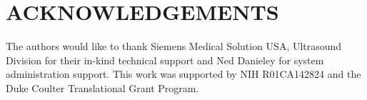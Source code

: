 \section*{ACKNOWLEDGEMENTS}
The authors would like to thank Siemens Medical Solution USA, Ultrasound
Division for their in-kind technical support and Ned Danieley for system administration support.
This work was supported by NIH R01CA142824 and the Duke Coulter Translational Grant Program.

